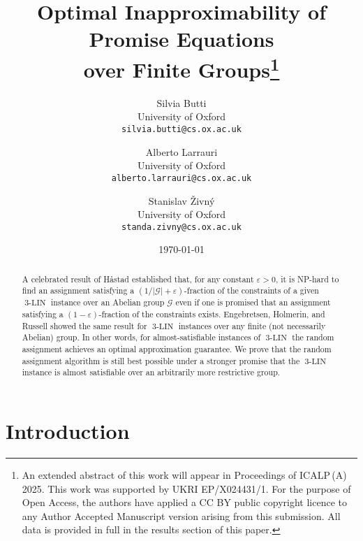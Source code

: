 \documentclass[a4paper,11pt]{article}
\theoremstyle{definition}
\newcommand{\gr}{\mathscr{G}}
\newcommand{\eq}{\ensuremath{\operatorname{3-LIN}}}
\begin{document}
\title{Optimal Inapproximability of Promise Equations\\ over Finite Groups\thanks{An extended abstract of this work will appear in Proceedings of ICALP\,(A) 2025. This work was supported by UKRI EP/X024431/1. For the purpose of Open Access, the authors have applied a CC BY public copyright licence to any Author Accepted Manuscript version arising from this submission. All data is provided in full in the results section of this paper.}}

\author{Silvia Butti\\
University of Oxford\\
\texttt{silvia.butti@cs.ox.ac.uk}
\and
Alberto Larrauri\\
University of Oxford\\
\texttt{alberto.larrauri@cs.ox.ac.uk}
\and
Stanislav \v{Z}ivn\'y\\
University of Oxford\\
\texttt{standa.zivny@cs.ox.ac.uk}
}
\date{\today}



\maketitle

\begin{abstract}

A celebrated result of H{\aa}stad established that, for any constant $\varepsilon>0$,
it is NP-hard to find an assignment satisfying a $(1/|\gr|+\varepsilon)$-fraction
of the constraints of a given $\eq$ instance over an Abelian group $\gr$ even if
one is promised that an assignment satisfying a $(1-\varepsilon)$-fraction of
the constraints exists. Engebretsen, Holmerin, and Russell showed the same
result for $\eq$ instances over any finite (not necessarily Abelian) group.
In other words, for almost-satisfiable instances of $\eq$ the random
assignment achieves an optimal approximation guarantee.
We prove that the random assignment algorithm is still best possible under a stronger
promise that the $\eq$ instance is almost satisfiable over an arbitrarily
more restrictive group.

\end{abstract}

\section{Introduction}
\end{document}
